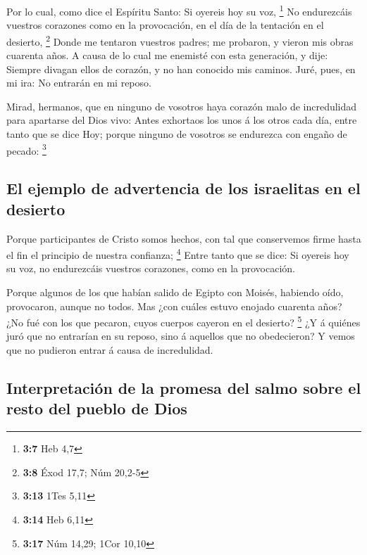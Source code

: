  Por lo cual, como dice el Espíritu Santo: Si oyereis hoy
su voz, \footnote{\textbf{3:7} Heb 4,7}  No endurezcáis
vuestros corazones como en la provocación, en el día de la tentación en
el desierto, \footnote{\textbf{3:8} Éxod 17,7; Núm 20,2-5}
 Donde me tentaron vuestros padres; me probaron, y vieron
mis obras cuarenta años.  A causa de lo cual me enemisté
con esta generación, y dije: Siempre divagan ellos de corazón, y no han
conocido mis caminos.  Juré, pues, en mi ira: No entrarán
en mi reposo.

 Mirad, hermanos, que en ninguno de vosotros haya corazón
malo de incredulidad para apartarse del Dios vivo:  Antes
exhortaos los unos á los otros cada día, entre tanto que se dice Hoy;
porque ninguno de vosotros se endurezca con engaño de pecado:
\footnote{\textbf{3:13} 1Tes 5,11}

\hypertarget{el-ejemplo-de-advertencia-de-los-israelitas-en-el-desierto}{%
\subsection{El ejemplo de advertencia de los israelitas en el
desierto}\label{el-ejemplo-de-advertencia-de-los-israelitas-en-el-desierto}}

 Porque participantes de Cristo somos hechos, con tal que
conservemos firme hasta el fin el principio de nuestra confianza;
\footnote{\textbf{3:14} Heb 6,11}  Entre tanto que se
dice: Si oyereis hoy su voz, no endurezcáis vuestros corazones, como en
la provocación.

 Porque algunos de los que habían salido de Egipto con
Moisés, habiendo oído, provocaron, aunque no todos.  Mas
¿con cuáles estuvo enojado cuarenta años? ¿No fué con los que pecaron,
cuyos cuerpos cayeron en el desierto? \footnote{\textbf{3:17} Núm 14,29;
  1Cor 10,10}  ¿Y á quiénes juró que no entrarían en su
reposo, sino á aquellos que no obedecieron?  Y vemos que
no pudieron entrar á causa de incredulidad.

\hypertarget{interpretaciuxf3n-de-la-promesa-del-salmo-sobre-el-resto-del-pueblo-de-dios}{%
\subsection{Interpretación de la promesa del salmo sobre el resto del
pueblo de
Dios}\label{interpretaciuxf3n-de-la-promesa-del-salmo-sobre-el-resto-del-pueblo-de-dios}}

